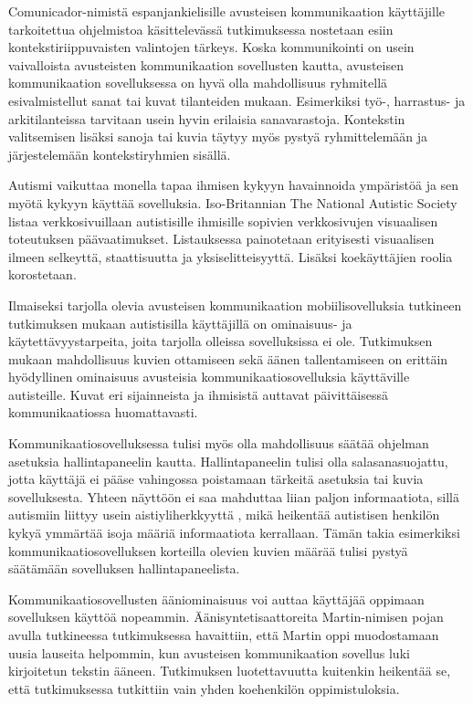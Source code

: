 \documentclass[utf8]{gradu3}
\begin{document}
\label{AAC-context-settings}
Comunicador-nimistä espanjankielisille avusteisen kommunikaation käyttäjille tarkoitettua ohjelmistoa käsittelevässä tutkimuksessa \parencite[]{graphic-communicator} nostetaan esiin kontekstiriippuvaisten valintojen tärkeys. Koska kommunikointi on usein vaivalloista avusteisten kommunikaation sovellusten kautta, avusteisen kommunikaation sovelluksessa on hyvä olla mahdollisuus ryhmitellä esivalmistellut sanat tai kuvat tilanteiden mukaan. Esimerkiksi työ-, harrastus- ja arkitilanteissa tarvitaan usein hyvin erilaisia sanavarastoja. Kontekstin valitsemisen lisäksi sanoja tai kuvia täytyy myös pystyä ryhmittelemään ja järjestelemään kontekstiryhmien sisällä.

\label{AAC-staticity}
Autismi vaikuttaa monella tapaa ihmisen kykyyn havainnoida ympäristöä ja sen myötä kykyyn käyttää sovelluksia. Iso-Britannian The National Autistic Society listaa verkkosivuillaan \parencite[]{autism-friendly-websites} autistisille ihmisille sopivien verkkosivujen visuaalisen toteutuksen päävaatimukset. Listauksessa painotetaan erityisesti visuaalisen ilmeen selkeyttä, staattisuutta ja yksiselitteisyyttä. Lisäksi koekäyttäjien roolia korostetaan.

Ilmaiseksi tarjolla olevia avusteisen kommunikaation mobiilisovelluksia tutkineen tutkimuksen \parencite[]{autism-mobile-usability} mukaan autistisilla käyttäjillä on ominaisuus- ja käytettävyystarpeita, joita tarjolla olleissa sovelluksissa ei ole. Tutkimuksen mukaan mahdollisuus kuvien ottamiseen sekä äänen tallentamiseen on erittäin hyödyllinen ominaisuus avusteisia kommunikaatiosovelluksia käyttäville autisteille. Kuvat eri sijainneista ja ihmisistä auttavat päivittäisessä kommunikaatiossa huomattavasti. \label{AAC-photos}

\label{AAC-settings}
Kommunikaatiosovelluksessa tulisi myös olla mahdollisuus säätää ohjelman asetuksia hallintapaneelin kautta. Hallintapaneelin tulisi olla salasanasuojattu, jotta käyttäjä ei pääse vahingossa poistamaan tärkeitä asetuksia tai kuvia sovelluksesta. Yhteen näyttöön ei saa mahduttaa liian paljon informaatiota, sillä autismiin liittyy usein aistiyliherkkyyttä \parencite[]{autism-sensory}, mikä heikentää autistisen henkilön kykyä ymmärtää isoja määriä informaatiota kerrallaan. Tämän takia esimerkiksi kommunikaatiosovelluksen korteilla olevien kuvien määrää tulisi pystyä säätämään sovelluksen hallintapaneelista. \label{AAC-cardsize}

\label{AAC-soundsynth}
Kommunikaatiosovellusten ääniominaisuus voi auttaa käyttäjää oppimaan sovelluksen käyttöä nopeammin. Äänisyntetisaattoreita Martin-nimisen pojan avulla tutkineessa tutkimuksessa \parencite[]{voca-efficacy} havaittiin, että Martin oppi muodostamaan uusia lauseita helpommin, kun avusteisen kommunikaation sovellus luki kirjoitetun tekstin ääneen. Tutkimuksen luotettavuutta kuitenkin heikentää se, että tutkimuksessa tutkittiin vain yhden koehenkilön oppimistuloksia.
\end{document}
